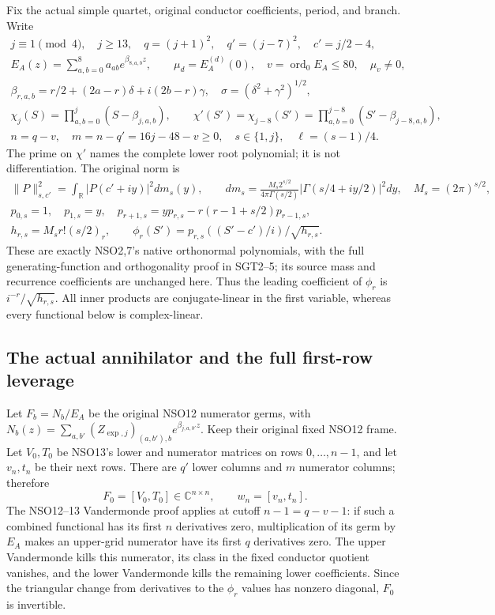 \documentclass[11pt,a4paper]{article}
\begin{document}
Fix the actual simple quartet, original conductor coefficients, period,
and branch. Write
\[
\begin{gathered}
j\equiv1\pmod4,\quad j\ge13,\quad q=(j+1)^2,\quad q'=(j-7)^2,
\quad c'=j/2-4,\\
E_A(z)=\sum_{a,b=0}^8a_{ab}e^{\beta_{8,a,b}z},\qquad
\mu_d=E_A^{(d)}(0),\quad v=\operatorname{ord}_0E_A\le80,
\quad\mu_v\ne0,\\
\beta_{r,a,b}=r/2+(2a-r)\delta+i(2b-r)\gamma,\quad
\sigma=(\delta^2+\gamma^2)^{1/2},\\
\chi_j(S)=\prod_{a,b=0}^j(S-\beta_{j,a,b}),\qquad
\chi'(S')=\chi_{j-8}(S')=\prod_{a,b=0}^{j-8}(S'-\beta_{j-8,a,b}),\\
n=q-v,\quad m=n-q'=16j-48-v\ge0,
\quad s\in\{1,j\},\quad \ell=(s-1)/4.
\end{gathered}\tag{FRG1}
\]
The prime on $\chi'$ names the complete lower root polynomial; it is
not differentiation. The original norm is
\[
\begin{gathered}
\|P\|_{s,c'}^2=\int_{\mathbb R}|P(c'+iy)|^2dm_s(y),\qquad
dm_s=\frac{M_s2^{s/2}}{4\pi\Gamma(s/2)}
 |\Gamma(s/4+iy/2)|^2dy,\quad M_s=(2\pi)^{s/2},\\
p_{0,s}=1,\quad p_{1,s}=y,\quad
p_{r+1,s}=yp_{r,s}-r(r-1+s/2)p_{r-1,s},\\
h_{r,s}=M_sr!(s/2)_r,\qquad
\phi_r(S')=p_{r,s}((S'-c')/i)/\sqrt{h_{r,s}}.
\end{gathered}\tag{FRG2}
\]
These are exactly NSO2,7's native orthonormal polynomials, with the
full generating-function and orthogonality proof in SGT2--5; its
source mass and recurrence coefficients are unchanged here.
Thus the leading coefficient of $\phi_r$ is
$i^{-r}/\sqrt{h_{r,s}}$. All inner products are conjugate-linear
in the first variable, whereas every functional below is complex-linear.

\subsection{The actual annihilator and the full first-row leverage}
Let $F_b=N_b/E_A$ be the original NSO12 numerator germs, with
$N_b(z)=\sum_{a,b'}(Z_{\exp,j})_{(a,b'),b}e^{\beta_{j,a,b'}z}$.
Keep their original fixed NSO12 frame. Let $V_0,T_0$ be NSO13's lower
and numerator matrices on rows $0,\ldots,n-1$, and let $v_n,t_n$ be
their next rows. There are $q'$ lower columns and $m$ numerator columns;
therefore
\[
F_0=[V_0,T_0]\in\mathbb C^{n\times n},\qquad w_n=[v_n,t_n].
\tag{FRG3}
\]
The NSO12--13 Vandermonde proof applies at cutoff $n-1=q-v-1$:
if such a combined functional has its first $n$ derivatives zero,
multiplication of its germ by $E_A$ makes an upper-grid numerator
have its first $q$ derivatives zero. The upper Vandermonde kills this
numerator, its class in the fixed conductor quotient vanishes, and the
lower Vandermonde kills the remaining lower coefficients. Since the
triangular change from derivatives to the $\phi_r$ values has nonzero
diagonal, $F_0$ is invertible.
\end{document}
